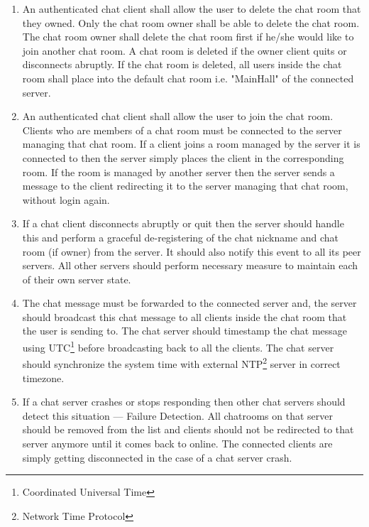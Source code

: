 \documentclass[dareport.tex]{subfiles}
\begin{document}
\begin{enumerate}[leftmargin=*]
\item An authenticated chat client shall allow the user to delete the chat room that they owned. Only the chat room owner shall be able to delete the chat room. The chat room owner shall delete the chat room first if he/she would like to join another chat room. A chat room is deleted if the owner client quits or disconnects abruptly. If the chat room is deleted, all users inside the chat room shall place into the default chat room i.e. "MainHall" of the connected server.

\item An authenticated chat client shall allow the user to join the chat room. Clients who are members of a chat room must be connected to the server managing that chat room. If a client joins a room managed by the server it is connected to then the server simply places the client in the corresponding room. If the room is managed by another server then the server sends a message to the client redirecting it to the server managing that chat room, without login again.

\item If a chat client disconnects abruptly or quit then the server should handle this and perform a graceful de-registering of the chat nickname and chat room (if owner) from the server. It should also notify this event to all its peer servers. All other servers should perform necessary measure to maintain each of their own server state.

\item The chat message must be forwarded to the connected server and, the server should broadcast this chat message to all clients inside the chat room that the user is sending to. The chat server should timestamp the chat message using UTC\footnote{Coordinated Universal Time} before broadcasting back to all the clients. The chat server should synchronize the system time with external NTP\footnote{Network Time Protocol} server in correct timezone.

\item If a chat server crashes or stops responding then other chat servers should detect this situation --- Failure Detection. All chatrooms on that server should be removed from the list and clients should not be redirected to that server anymore until it comes back to online. The connected clients are simply getting disconnected in the case of a chat server crash.

\end{enumerate}
\end{document}
